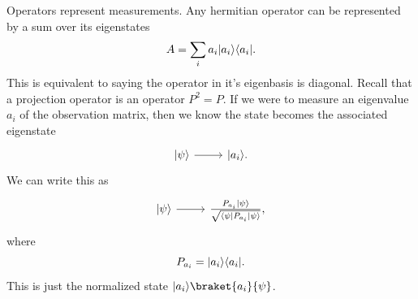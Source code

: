 Operators represent measurements. Any hermitian operator can be represented by a sum over its eigenstates
\[
	A=\sum_{i} a_i \lvert a_i\rangle \langle a_i\rvert 
.\]
This is equivalent to saying the operator in it's eigenbasis is diagonal. Recall that a projection operator is an operator $P^2=P$. If we were to measure an eigenvalue $a_i$ of the observation matrix, then we know the state becomes the associated eigenstate
\[\begin{tikzcd}[row sep = 2.5em, column sep = 2.5em]
	\ket{\psi } \arrow[r]&\ket{a_i} .
\end{tikzcd}\]
We can write this as
\[\begin{tikzcd}[row sep = 2.5em, column sep = 2.5em]
	\ket{\psi } \arrow[r]&\frac{P_{a_i} \ket{\psi } }{\sqrt{\bra{\psi } P_{a_i} \ket{\psi } } } ,
\end{tikzcd}\]
where
\[
	P_{a_i} =\lvert a_i\rangle \langle a_i\rvert 
.\]
This is just the normalized state $\ket{a_i} \braket{a_i}{\psi } $.
